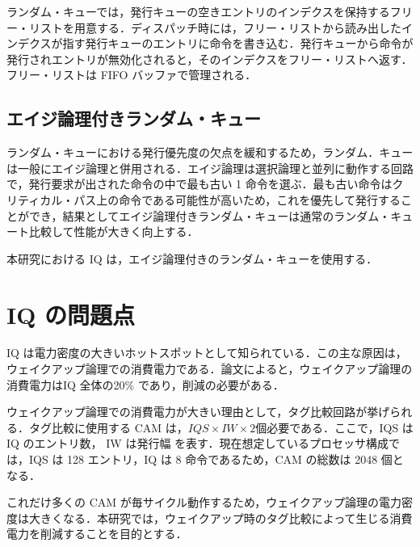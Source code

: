 ランダム・キューでは，発行キューの空きエントリのインデクスを保持するフリー・リストを用意する．ディスパッチ時には，フリー・リストから読み出したインデクスが指す発行キューのエントリに命令を書き込む．発行キューから命令が発行されエントリが無効化されると，そのインデクスをフリー・リストへ返す．フリー・リストは FIFO バッファで管理される．

\subsection{エイジ論理付きランダム・キュー}
ランダム・キューにおける発行優先度の欠点を緩和するため，ランダム．キューは一般にエイジ論理と併用される．エイジ論理は選択論理と並列に動作する回路で，発行要求が出された命令の中で最も古い 1 命令を選ぶ．最も古い命令はクリティカル・パス上の命令である可能性が高いため，これを優先して発行することができ，結果としてエイジ論理付きランダム・キューは通常のランダム・キュート比較して性能が大きく向上する．

本研究における IQ は，エイジ論理付きのランダム・キューを使用する．

\section{IQ の問題点}
\label{sec:iq_problem}
IQ は電力密度の大きいホットスポットとして知られている．この主な原因は，ウェイクアップ論理での消費電力である．論文によると，ウェイクアップ論理の消費電力はIQ 全体の20\% であり，削減の必要がある．

ウェイクアップ論理での消費電力が大きい理由として，タグ比較回路が挙げられる．タグ比較に使用する CAM は，$IQS \times IW \times 2$個必要である．ここで，IQS は IQ のエントリ数， IW は発行幅 を表す．現在想定しているプロセッサ構成では，IQS は 128 エントリ，IQ は 8 命令であるため，CAM の総数は 2048 個となる．

これだけ多くの CAM が毎サイクル動作するため，ウェイクアップ論理の電力密度は大きくなる．本研究では，ウェイクアップ時のタグ比較によって生じる消費電力を削減することを目的とする．
















